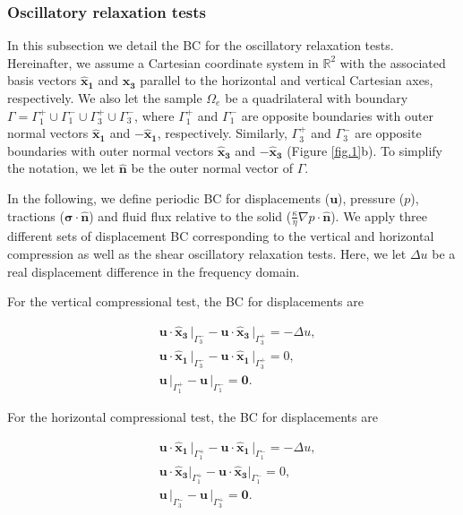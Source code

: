\documentclass[draft]{agujournal2019}
\begin{document}
\subsubsection{Oscillatory relaxation tests}
In this subsection we detail the BC for the oscillatory relaxation tests. 
Hereinafter, we assume a Cartesian coordinate system in $\mathbb R^2$ with the associated basis vectors $\bm{\hat x_1}$ and $\bm{\hat x_3}$ parallel to the horizontal and vertical Cartesian axes, respectively. We also
let the sample $\Omega_e$ be a quadrilateral with boundary $\Gamma = \Gamma_1^+ \cup \Gamma_1^- \cup \Gamma_3^+ \cup \Gamma_3^- $, where $\Gamma_1^+ $ and $\Gamma_1^- $ are opposite boundaries with outer normal vectors $\bm{\hat x_1}$ and $ -\bm{\hat x_1}$, respectively. Similarly, $\Gamma_3^+ $ and $\Gamma_3^- $ are opposite boundaries with outer normal vectors $\bm{\hat x_3}$ and $ -\bm{\hat x_3}$ (Figure \ref{fig.1}b). To simplify the notation, we let $ \bm{\hat n}$ be the outer normal vector
of $\Gamma$.

In the following, we define periodic BC for displacements ($\bm{u}$), pressure ($p$), tractions ($\bm{\sigma}\cdot \bm{\hat n} $) and fluid flux relative to the solid ($\frac{\kappa}{\eta} \nabla p \cdot \bm{\hat n}$). We apply three different sets of displacement BC corresponding to the vertical and horizontal compression as well as the shear oscillatory relaxation tests. Here, we let $\Delta u$ be a real displacement difference in the frequency domain.

For the vertical compressional test, the BC for displacements are
\begin{linenomath*}
\begin{equation}\label{Eq.8}
\begin{split}
&  \bm{u} \cdot \bm{\hat{x}_3} \, \vert_{\Gamma_3^-} - \bm{u}\cdot \bm{\hat{x}_3}\, \vert_{\Gamma_3^+} =- \Delta u, \\
&  \bm{u} \cdot \bm{\hat{x}_1}\, \vert_{\Gamma_3^-} - \bm{u} \cdot \bm{\hat{x}_1} \, \vert_{\Gamma_3^+} = 0, \\
& \bm{u}\,\vert_{\Gamma_1^+} - \bm{u}\,\vert_{\Gamma_1^-} = \bm{0}.
\end{split}
\end{equation}
\end{linenomath*}

For the horizontal compressional test, the BC for displacements are
\begin{linenomath*}
\begin{equation}\label{Eq.9}
\begin{split}
& \bm{u} \cdot \bm{\hat{x}_1}\, \vert_{\Gamma_1^+}-\bm{u} \cdot \bm{\hat{x}_1}\, \vert_{\Gamma_1^-} = - \Delta u, \\
& \bm{u} \cdot \bm{\hat{x}_3} \vert_{\Gamma_1^+}- \bm{u} \cdot \bm{\hat{x}_3}\vert_{\Gamma_1^-} =  0,  \\
& \bm{u}\,\vert_{\Gamma_3^-}- \bm{u}\,\vert_{\Gamma_3^+} = \bm{0}.
\end{split}
\end{equation}
\end{linenomath*}
\end{document}
